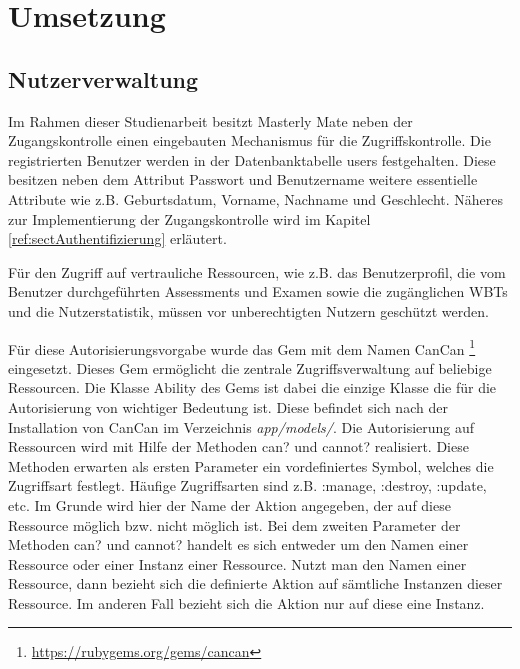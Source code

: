 \chapter{Umsetzung}\label{ref:chaptImplementation}

\section{Nutzerverwaltung}\label{ref:sectNutzerverwaltung}
Im Rahmen dieser Studienarbeit besitzt Masterly Mate neben der Zugangskontrolle
einen eingebauten Mechanismus für die Zugriffskontrolle. Die registrierten
Benutzer werden in der Datenbanktabelle users festgehalten. Diese besitzen neben
dem Attribut Passwort und Benutzername weitere essentielle Attribute wie z.B.
Geburtsdatum, Vorname, Nachname und Geschlecht. Näheres zur Implementierung der
Zugangskontrolle wird im Kapitel \ref{ref:sectAuthentifizierung} erläutert.

Für den Zugriff auf vertrauliche Ressourcen, wie z.B. das Benutzerprofil, die
vom Benutzer durchgeführten Assessments und Examen sowie die zugänglichen WBTs
und die Nutzerstatistik, müssen vor unberechtigten Nutzern geschützt werden.

Für diese Autorisierungsvorgabe wurde das Gem mit dem Namen CanCan
\footnote{\url{https://rubygems.org/gems/cancan}} eingesetzt. Dieses Gem
ermöglicht die zentrale Zugriffsverwaltung auf beliebige Ressourcen. Die Klasse Ability des
Gems ist dabei die einzige Klasse die für die Autorisierung von wichtiger
Bedeutung ist. Diese befindet sich nach der Installation von CanCan im
Verzeichnis \textit{app/models/}. Die Autorisierung auf Ressourcen wird mit
Hilfe der Methoden can? und cannot? realisiert. Diese Methoden erwarten als ersten
Parameter ein vordefiniertes Symbol, welches die Zugriffsart festlegt. Häufige
Zugriffsarten sind z.B. :manage, :destroy, :update, etc. Im Grunde wird hier der Name der
Aktion angegeben, der auf diese Ressource möglich bzw. nicht möglich ist. Bei
dem zweiten Parameter der Methoden can? und cannot? handelt es sich entweder um
den Namen einer Ressource oder einer Instanz einer Ressource. Nutzt man den
Namen einer Ressource, dann bezieht sich die definierte Aktion auf sämtliche
Instanzen dieser Ressource. Im anderen Fall bezieht sich die Aktion nur auf
diese eine Instanz. 

